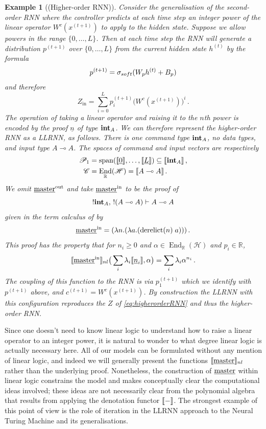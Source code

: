 \documentclass[english,letter paper,12pt,leqno]{article}
\theoremstyle{example}
\newtheorem{example}[theorem]{Example}
\numberwithin{equation}{section}
\def\be{\begin{equation}}
\def\ee{\end{equation}}
\DeclareMathOperator{\End}{End}
\DeclareMathOperator{\derelict}{derelict}
\begin{document}
\begin{example}[(Higher-order RNN)] Consider the generalisation of the second-order RNN where the controller predicts at each time step an integer power of the linear operator $W^c(x^{(t+1)})$ to apply to the hidden state. Suppose we allow powers in the range $\{0,\ldots,L\}$. Then at each time step the RNN will generate a distribution $p^{(t+1)}$ over $\{0,\ldots,L\}$ from the current hidden state $h^{(t)}$ by the formula
\[
p^{(t+1)} = \sigma_{soft}( W_p h^{(t)} + B_p )
\]
and therefore
\be\label{eq:higherorderRNN}
Z_{\operatorname{in}} = \sum_{i=0}^L p_i^{(t+1)} \big( W^c(x^{(t+1)}) \big)^i\,.
\ee
The operation of taking a linear operator and raising it to the $n$th power is encoded by the proof $\underline{n}$ of type $\textbf{int}_A$. We can therefore represent the higher-order RNN as a LLRNN, as follows. There is one command type $\textbf{int}_A$, no data types, and input type $A \multimap A$. The spaces of command and input vectors are respectively
\begin{align*}
\mathscr{P}_1 &= \operatorname{span}(\den{\underline{0}}, \ldots, \den{\underline{L}}) \subseteq \den{\inta_A}\,,\\
\mathscr{C} &= \End_{\mathbb{R}}(\mathscr{H}) = \den{A \multimap A}\,.
\end{align*}
We omit $\underline{\textup{master}}^{\mathrm{out}}$ and take $\underline{\textup{master}}^{\mathrm{in}}$ to be the proof of
\[
{!}\textbf{int}_A, \, {!}(A \multimap A) \vdash A \multimap A
\]
given in the term calculus of \cite{benton_etal} by
\[
\master^{\mathrm{in}} = (\lambda n. (\lambda a. (\derelict(n) \; a)))\,.
\]
This proof has the property that for $n_i \ge 0$ and $\alpha \in \End_{\mathbb{R}}(\mathscr{H})$ and $p_i \in \mathbb{R}$,
\be
\den{\master^{\mathrm{in}}}_{nl}\big( \sum_i \lambda_i \den{\underline{n}_i}, \alpha \big) = \sum_i \lambda_i \alpha^{n_i}\,.
\ee
The coupling of this function to the RNN is via $p_1^{(t+1)}$ which we identify with $p^{(t+1)}$ above, and $c^{(t+1)} = W^c(x^{(t+1)})$. By construction the LLRNN with this configuration reproduces the $Z$ of \eqref{eq:higherorderRNN} and thus the higher-order RNN.
\end{example}

Since one doesn't need to know linear logic to understand how to raise a linear operator to an integer power, it is natural to wonder to what degree linear logic is actually necessary here. All of our models can be formulated without any mention of linear logic, and indeed we will generally present the functions $\llbracket \underline{\textup{master}} \rrbracket_{nl}$ rather than the underlying proof. Nonetheless, the construction of $\underline{\textup{master}}$ within linear logic constrains the model and makes conceptually clear the computational ideas involved; these ideas are not necessarily clear from the polynomial algebra that results from applying the denotation functor $\llbracket - \rrbracket$. The strongest example of this point of view is the role of iteration in the LLRNN approach to the Neural Turing Machine and its generalisations.
\end{document}
